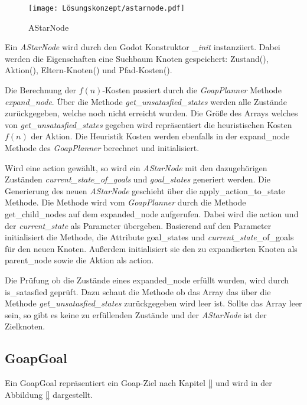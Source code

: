\begin{figure}[h]
  \centering
  \texttt{[image: Lösungskonzept/astarnode.pdf]}
	\captionsetup{justification=justified, format=plain}
  \caption{AStarNode}
  \label{fig:AStarNode}
\end{figure}


Ein \textit{AStarNode} wird durch den Godot Konstruktor \textit{\_init }instanziiert. Dabei werden die Eigenschaften eine Suchbaum Knoten gespeichert: Zustand(), Aktion(), Eltern-Knoten() und Pfad-Kosten().


Die Berechnung der $f(n)$-Kosten passiert durch die \textit{GoapPlanner} Methode \textit{expand\_node}. \"{U}ber die Methode \textit{get\_unsatasfied\_states} werden alle Zustände zurückgegeben, welche noch nicht erreicht wurden. Die Grö\ss{}e des Arrays welches von \textit{get\_unsatasfied\_states} gegeben wird repräsentiert die heuristischen Kosten $f(n)$ der Aktion. Die Heuristik Kosten werden ebenfalls in der expand\_node Methode des \textit{GoapPlanner} berechnet und initialisiert.

Wird eine action gewählt, so wird ein \textit{AStarNode} mit den dazugehörigen Zuständen \textit{current\_state\_of\_goals} und \textit{goal\_states} generiert werden. Die Generierung des neuen \textit{AStarNode} geschieht über die apply\_action\_to\_state Methode. Die Methode wird vom \textit{GoapPlanner} durch die Methode get\_child\_nodes auf dem expanded\_node aufgerufen. Dabei wird die action und der \textit{current\_state} als Parameter übergeben. Basierend auf den Parameter initialisiert die Methode, die Attribute goal\_states und \textit{current\_state}\_of\_goals für den neuen Knoten. Au\ss{}erdem initialisiert sie den zu expandierten Knoten als parent\_node sowie die Aktion als action.

Die Prüfung ob die Zustände eines expanded\_node erfüllt wurden, wird durch is\_satasfied geprüft. Dazu schaut die Methode ob das Array das über die Methode \textit{get\_unsatasfied\_states} zurückgegeben wird leer ist. Sollte das Array leer sein, so gibt es keine zu erfüllenden Zustände und der \textit{AStarNode} ist der Zielknoten.





\subsection{GoapGoal}
\label{chap:goapgoal uml}

Ein GoapGoal repräsentiert ein Goap-Ziel nach Kapitel \ref{} und wird in der Abbildung \ref{} dargestellt.

